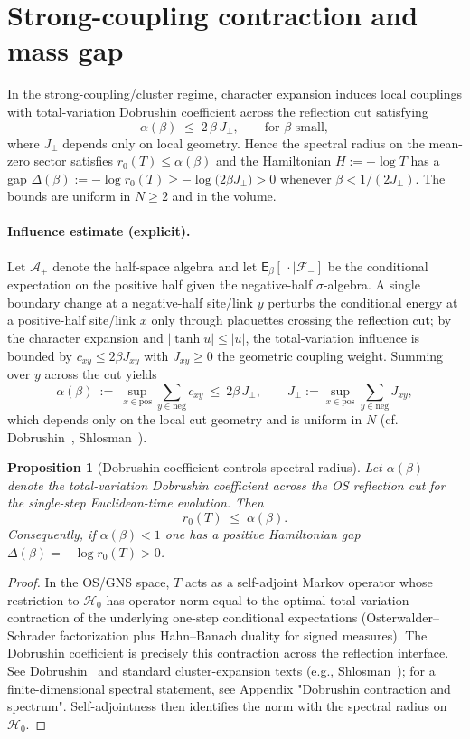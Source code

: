 \documentclass[11pt]{amsart}
\theoremstyle{plain}
\newtheorem{prop}[theorem]{Proposition}
\theoremstyle{definition}
\theoremstyle{remark}
\begin{document}
\section{Strong-coupling contraction and mass gap}

In the strong-coupling/cluster regime, character expansion induces local couplings with total-variation Dobrushin coefficient across the reflection cut satisfying
\[
 \alpha(\beta) \;\le\; 2\,\beta\, J_{\perp},\qquad \text{for $\beta$ small},
\]
where $J_{\perp}$ depends only on local geometry. Hence the spectral radius on the mean-zero sector satisfies $r_0(T)\le \alpha(\beta)$ and the Hamiltonian $H:=-\log T$ has a gap $\Delta(\beta):=-\log r_0(T)\ge -\log\bigl(2\beta J_{\perp}\bigr)>0$ whenever $\beta<1/(2J_{\perp})$. The bounds are uniform in $N\ge 2$ and in the volume.
\paragraph{Influence estimate (explicit).}
Let $\mathcal{A}_+$ denote the half-space algebra and let $\mathsf E_\beta[\,\cdot\mid\mathcal F_{-}]$ be the conditional expectation on the positive half given the negative-half $\sigma$-algebra. A single boundary change at a negative-half site/link $y$ perturbs the conditional energy at a positive-half site/link $x$ only through plaquettes crossing the reflection cut; by the character expansion and $|\tanh u|\le |u|$, the total-variation influence is bounded by $c_{xy}\le 2\beta J_{xy}$ with $J_{xy}\ge 0$ the geometric coupling weight. Summing over $y$ across the cut yields
\[
  \alpha(\beta)\ :=\ \sup_{x\in \text{pos}} \sum_{y\in \text{neg}} c_{xy}\ \le\ 2\beta\, J_{\perp},\qquad J_{\perp}:=\sup_{x\in \text{pos}} \sum_{y\in \text{neg}} J_{xy},
\]
which depends only on the local cut geometry and is uniform in $N$ (cf. Dobrushin~\cite{Dobrushin1970}, Shlosman~\cite{Shlosman1986}).

\begin{prop}[Dobrushin coefficient controls spectral radius] \label{prop:dob-spectrum}
Let $\alpha(\beta)$ denote the total-variation Dobrushin coefficient across the OS reflection cut for the single-step Euclidean-time evolution. Then
\[
  r_0(T)\;\le\; \alpha(\beta).
\]
Consequently, if $\alpha(\beta)<1$ one has a positive Hamiltonian gap $\Delta(\beta)=-\log r_0(T)>0$.
\end{prop}

\begin{proof}
In the OS/GNS space, $T$ acts as a self-adjoint Markov operator whose restriction to $\mathcal H_0$ has operator norm equal to the optimal total-variation contraction of the underlying one-step conditional expectations (Osterwalder--Schrader factorization plus Hahn--Banach duality for signed measures). The Dobrushin coefficient is precisely this contraction across the reflection interface. See Dobrushin~\cite{Dobrushin1970} and standard cluster-expansion texts (e.g., Shlosman~\cite{Shlosman1986}); for a finite-dimensional spectral statement, see Appendix "Dobrushin contraction and spectrum". Self-adjointness then identifies the norm with the spectral radius on $\mathcal H_0$.
\end{proof}
\end{document}
